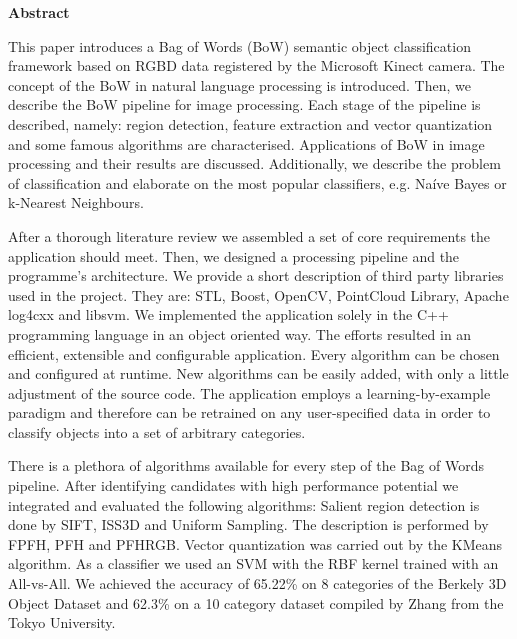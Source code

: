 \vspace{3.0cm}

\pagebreak

\begin{center}
\begin{LARGE}\textbf{Abstract}\end{LARGE}
\end{center}

\vspace{1.0cm}
	
	This paper introduces a Bag of Words (BoW) semantic object classification framework based on RGBD data registered by the Microsoft Kinect camera. The concept of the BoW in natural language processing is introduced. Then, we describe the BoW pipeline for image processing. Each stage of the pipeline is described, namely: region detection, feature extraction and vector quantization and some famous algorithms are characterised. Applications of BoW in image processing and their results are discussed. Additionally, we describe the problem of classification and elaborate on the most popular classifiers, e.g. Na\'ive Bayes or k-Nearest Neighbours.
	
	After a thorough literature review we assembled a set of core requirements the application should meet. Then, we designed a processing pipeline and the programme's architecture. We provide a short description of third party libraries used in the project. They are: STL, Boost, OpenCV, PointCloud Library, Apache log4cxx and libsvm. We implemented the application solely in the C++ programming language in an object oriented way. The efforts resulted in an efficient, extensible and configurable application. Every algorithm can be chosen and configured at runtime. New algorithms can be easily added, with only a little adjustment of the source code. The application employs a learning-by-example paradigm and therefore can be retrained on any user-specified data in order to classify objects into a set of arbitrary categories. 
	
	There is a plethora of algorithms available for every step of the Bag of Words pipeline. After identifying candidates with high performance potential we integrated  and evaluated the following algorithms: Salient region detection is done by SIFT, ISS3D and Uniform Sampling. The description is performed by FPFH, PFH and PFHRGB. Vector quantization was carried out by the KMeans algorithm. As a classifier we used an SVM with the RBF kernel trained with an All-vs-All.
	We achieved the accuracy of 65.22\% on 8 categories of the Berkely 3D Object Dataset and 62.3\% on a 10 category dataset compiled by Zhang from the Tokyo University.

